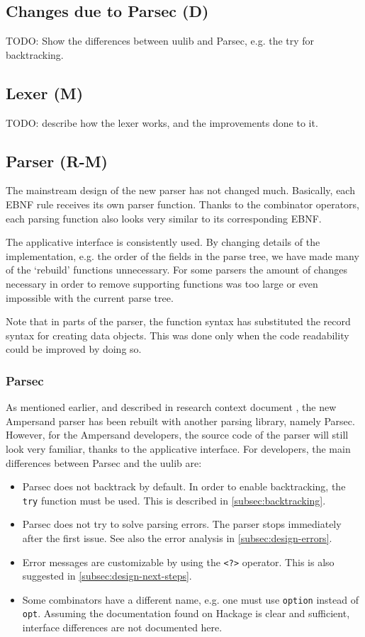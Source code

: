 \subsection{Changes due to Parsec (D)}
TODO: Show the differences between uulib and Parsec, e.g. the try for backtracking.

\subsection{Lexer (M)}
\label{subsec:lexer}
TODO: describe how the lexer works, and the improvements done to it.

\subsection{Parser (R-M)}
\label{subsec:design-parser}
The mainstream design of the new parser has not changed much.
Basically, each EBNF rule receives its own parser function.
Thanks to the combinator operators, each parsing function also looks very similar to its corresponding EBNF.

The applicative interface is consistently used.
By changing details of the implementation, e.g. the order of the fields in the parse tree, we have made many of the `rebuild' functions unnecessary.
For some parsers the amount of changes necessary in order to remove supporting functions was too large or even impossible with the current parse tree.

Note that in parts of the parser, the function syntax has substituted the record syntax for creating data objects.
This was done only when the code readability could be improved by doing so.

\subsubsection{Parsec}
\label{subsec:design-parsing-lib}
As mentioned earlier, and described in research context document , the new Ampersand parser has been rebuilt with another parsing library, namely Parsec.
However, for the Ampersand developers, the source code of the parser will still look very familiar, thanks to the applicative interface.
For developers, the main differences between Parsec and the uulib are:
\begin{itemize}
  \item Parsec does not backtrack by default.
    In order to enable backtracking, the \texttt{try} function must be used.
    This is described in \autoref{subsec:backtracking}.
  \item Parsec does not try to solve parsing errors.
    The parser stops immediately after the first issue.
    See also the error analysis in \autoref{subsec:design-errors}.
  \item Error messages are customizable by using the \texttt{<?>} operator.
    This is also suggested in \autoref{subsec:design-next-steps}.
  \item Some combinators have a different name, e.g. one must use \texttt{option} instead of \texttt{opt}.
    Assuming the documentation found on Hackage is clear and sufficient, interface differences are not documented here.
\end{itemize}

